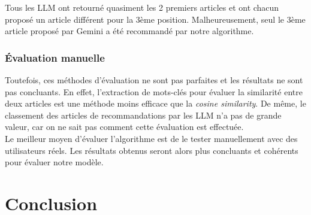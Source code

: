 \documentclass[a4paper,12pt]{article}
\begin{document}
Tous les LLM ont retourné quasiment les 2 premiers articles et ont chacun proposé un article différent pour la 3ème position. Malheureusement, seul le 3ème article proposé par Gemini a été recommandé par notre algorithme.

\subsubsection{Évaluation manuelle}

Toutefois, ces méthodes d'évaluation ne sont pas parfaites et les résultats ne sont pas concluants. En effet, l'extraction de mots-clés pour évaluer la similarité entre deux articles est une méthode moins efficace que la \textit{cosine similarity}. De même, le classement des articles de recommandations par les LLM n'a pas de grande valeur, car on ne sait pas comment cette évaluation est effectuée.\\

Le meilleur moyen d'évaluer l'algorithme est de le tester manuellement avec des utilisateurs réels. Les résultats obtenus seront alors plus concluants et cohérents pour évaluer notre modèle.


\section{Conclusion}
\end{document}
